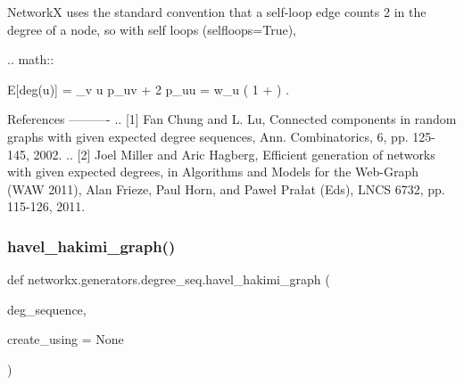 \begin{DoxyVerb}
NetworkX uses the standard convention that a self-loop edge counts 2
in the degree of a node, so with self loops (selfloops=True),

.. math::

   E[deg(u)] =  \sum_{v \ne u} p_{uv}  + 2 p_{uu}
            = w_u \left( 1 +  \right) .

References
----------
.. [1] Fan Chung and L. Lu, Connected components in random graphs with
   given expected degree sequences, Ann. Combinatorics, 6,
   pp. 125-145, 2002.
.. [2] Joel Miller and Aric Hagberg,
   Efficient generation of networks with given expected degrees,
   in Algorithms and Models for the Web-Graph (WAW 2011),
   Alan Frieze, Paul Horn, and Paweł Prałat (Eds), LNCS 6732,
   pp. 115-126, 2011.
\end{DoxyVerb}
 \mbox{\label{namespacenetworkx_1_1generators_1_1degree__seq_a210368f4322a6114b939560da3849c14}} 
\subsubsection{\texorpdfstring{havel\+\_\+hakimi\+\_\+graph()}{havel\_hakimi\_graph()}}
{\footnotesize\ttfamily def networkx.\+generators.\+degree\+\_\+seq.\+havel\+\_\+hakimi\+\_\+graph (\begin{DoxyParamCaption}\item[{}]{deg\+\_\+sequence,  }\item[{}]{create\+\_\+using = {\ttfamily None} }\end{DoxyParamCaption})}

